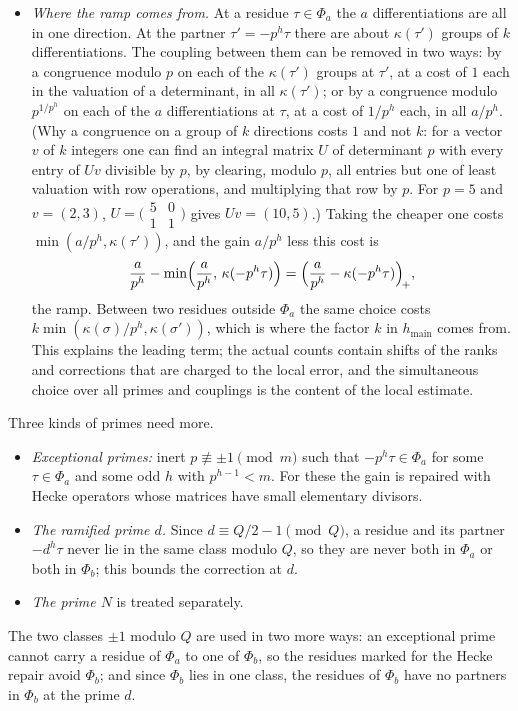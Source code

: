 \documentclass[11pt]{amsart}
\numberwithin{equation}{section}
\theoremstyle{definition}
\theoremstyle{remark}
\begin{document}
\begin{itemize}[leftmargin=2em]
\item \emph{Where the ramp comes from.} At a residue $\tau\in\Phi_a$ the $a$ differentiations are all in one direction. At the partner $\tau'=-p^h\tau$ there are about $\kappa(\tau')$ groups of $k$ differentiations. The coupling between them can be removed in two ways: by a congruence modulo $p$ on each of the $\kappa(\tau')$ groups at $\tau'$, at a cost of $1$ each in the valuation of a determinant, in all $\kappa(\tau')$; or by a congruence modulo $p^{1/p^h}$ on each of the $a$ differentiations at $\tau$, at a cost of $1/p^h$ each, in all $a/p^h$. (Why a congruence on a group of $k$ directions costs $1$ and not $k$: for a vector $v$ of $k$ integers one can find an integral matrix $U$ of determinant $p$ with every entry of $Uv$ divisible by $p$, by clearing, modulo $p$, all entries but one of least valuation with row operations, and multiplying that row by $p$. For $p=5$ and $v=(2,3)$, $U=\bigl(\begin{smallmatrix}5&0\\1&1\end{smallmatrix}\bigr)$ gives $Uv=(10,5)$.) Taking the cheaper one costs $\min(a/p^h,\kappa(\tau'))$, and the gain $a/p^h$ less this cost is
\begin{equation}\label{eq:rampmin}
 \frac a{p^h}-\min\Bigl(\frac a{p^h},\,\kappa(-p^h\tau)\Bigr)=\Bigl(\frac a{p^h}-\kappa(-p^h\tau)\Bigr)_{\!+},
\end{equation}
the ramp. Between two residues outside $\Phi_a$ the same choice costs $k\min(\kappa(\sigma)/p^h,\kappa(\sigma'))$, which is where the factor $k$ in $h_{\mathrm{main}}$ comes from. This explains the leading term; the actual counts contain shifts of the ranks and corrections that are charged to the local error, and the simultaneous choice over all primes and couplings is the content of the local estimate.
\end{itemize}
Three kinds of primes need more.
\begin{itemize}[leftmargin=2em]
\item \emph{Exceptional primes:} inert $p\not\equiv\pm1\pmod m$ such that $-p^h\tau\in\Phi_a$ for some $\tau\in\Phi_a$ and some odd $h$ with $p^{h-1}<m$. For these the gain is repaired with Hecke operators whose matrices have small elementary divisors.
\item \emph{The ramified prime $d$.} Since $d\equiv Q/2-1\pmod Q$, a residue and its partner $-d^h\tau$ never lie in the same class modulo $Q$, so they are never both in $\Phi_a$ or both in $\Phi_b$; this bounds the correction at $d$.
\item \emph{The prime $N$} is treated separately.
\end{itemize}
The two classes $\pm1$ modulo $Q$ are used in two more ways: an exceptional prime cannot carry a residue of $\Phi_a$ to one of $\Phi_b$, so the residues marked for the Hecke repair avoid $\Phi_b$; and since $\Phi_b$ lies in one class, the residues of $\Phi_b$ have no partners in $\Phi_b$ at the prime $d$.
\end{document}
